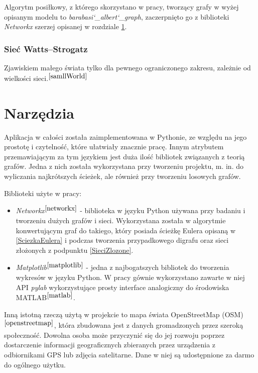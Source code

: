 \documentclass[a4paper, 12pt, twoside, openright]{article}
\begin{document}
 	
 	Algorytm posiłkowy, z którego skorzystano w pracy, tworzący grafy w wyżej opisanym modelu to \textit{barabasi\char`_albert\char`_graph}, zaczerpnięto go z biblioteki \textit{Networkx} szerzej opisanej w rozdziale \ref{narzedzia}.
	
	
\subsubsection{Sieć Watts–Strogatz}
\indent\par
Zjawiskiem małego świata tylko dla pewnego ograniczonego zakresu, zależnie od wielkości sieci.$^{\cite{samllWorld}}$

\newpage
\section{Narzędzia} \label{narzedzia}

\indent\par
	Aplikacja w całości została zaimplementowana w Pythonie, ze względu na jego prostotę i czytelność, które ułatwiały znacznie pracę. Innym atrybutem przemawiającym za tym językiem jest duża ilość bibliotek związanych z teorią grafów. Jedna z nich została wykorzystana przy tworzeniu projektu, m. in. do wyliczania najkrótszych ścieżek, ale również przy tworzeniu losowych grafów.

Biblioteki użyte w pracy:
\begin{itemize}
	\item \textit{Networkx}$^{\cite{networkx}}$ - biblioteka w języku Python używana przy badaniu i tworzeniu dużych grafów i sieci. Wykorzystana została w algorytmie konwertującym graf do takiego, który posiada ścieżkę Eulera opisaną w \ref{SciezkaEulera} i podczas tworzenia przypadkowego digrafu oraz sieci złożonych z podpunktu \ref{SieciZlozone}.
	\item \textit{Matplotlib}$^{\cite{matplotlib}}$ - jedna z najbogatszych bibliotek do tworzenia wykresów w języku Python. W pracy gównie wykorzystano zawarte w niej API \textit{pylab} wykorzystujące prosty interface analogiczny do środowiska MATLAB$^{\cite{matlab}}$.
\end{itemize}

	Inną istotną rzeczą użytą w projekcie to mapa świata OpenStreetMap (OSM)$^{\cite{openstreetmap}}$, która zbudowana jest z danych gromadzonych przez szeroką społeczność. Dowolna osoba może przyczynić się do jej rozwoju poprzez dostarczenie informacji geograficznych zbieranych przez urządzenia z odbiornikami GPS lub zdjęcia satelitarne. Dane w niej są udostępnione za darmo do ogólnego użytku.
\end{document}
